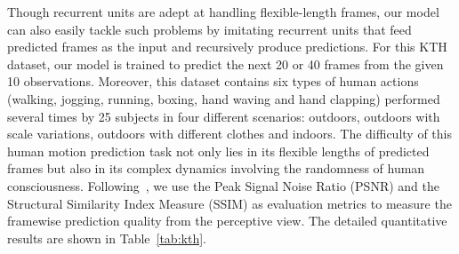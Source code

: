 \documentclass[10pt,twocolumn,letterpaper]{article}
\begin{document}
Though recurrent units are adept at handling flexible-length frames, our model can also easily tackle such problems by imitating recurrent units that feed predicted frames as the input and recursively produce predictions. For this KTH dataset, our model is trained to predict the next 20 or 40 frames from the given 10 observations. Moreover, this dataset contains six types of human actions (walking, jogging, running, boxing, hand waving and hand clapping) performed several times by 25 subjects in four different scenarios: outdoors, outdoors with scale variations, outdoors with different clothes and indoors. The difficulty of this human motion prediction task not only lies in its flexible lengths of predicted frames but also in its complex dynamics involving the randomness of human consciousness. Following~\cite{predrnn}, we use the Peak Signal Noise Ratio (PSNR) and the Structural Similarity Index Measure (SSIM) as evaluation metrics to measure the framewise prediction quality from the perceptive view. 
The detailed quantitative results are shown in Table~\ref{tab:kth}.
\end{document}

